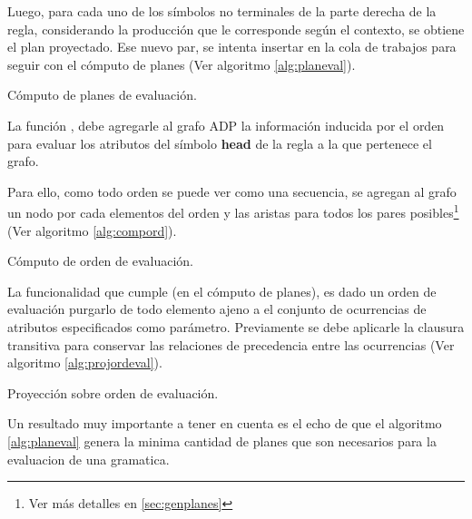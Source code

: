 Luego, para cada uno de los símbolos no terminales de la parte derecha de la regla, considerando la producción que le corresponde según el contexto, se obtiene el plan proyectado. Ese nuevo par, se intenta insertar en la cola de trabajos para seguir con el cómputo de planes (Ver algoritmo \ref{alg:planeval}).

\begin{algorithm}[!ht]

\vspace{-0.5cm}
\caption{\label{alg:planeval}Cómputo de planes de evaluación.}
\end{algorithm}

La función , debe agregarle al grafo ADP la información inducida por el orden para evaluar los atributos del símbolo \textbf{head} de la regla a la que pertenece el grafo.

Para ello, como todo orden se puede ver como una secuencia, se agregan al grafo un nodo por cada elementos del orden y las aristas para todos los pares posibles\footnote{Ver más detalles en \ref{sec:genplanes}} (Ver algoritmo \ref{alg:compord}).

\begin{algorithm}[!ht]

\vspace{-0.5cm}
\caption{\label{alg:compord}Cómputo de orden de evaluación.}
\end{algorithm}

La funcionalidad que cumple  (en el cómputo de planes), es dado un orden de evaluación purgarlo de todo elemento ajeno a el conjunto de ocurrencias de atributos especificados como parámetro. Previamente se debe aplicarle la clausura transitiva para conservar las relaciones de precedencia entre las ocurrencias (Ver algoritmo \ref{alg:projordeval}).

\begin{algorithm}[!ht]

\vspace{-0.5cm}
\caption{\label{alg:projordeval}Proyección sobre orden de evaluación.}
\end{algorithm}

Un resultado muy importante a tener en cuenta es el echo de que el algoritmo \ref{alg:planeval} genera la minima cantidad de planes que son necesarios para la evaluacion de una gramatica.

